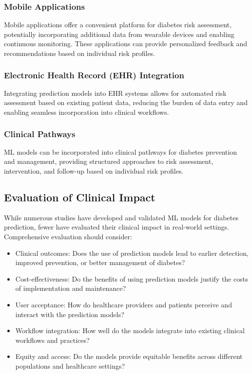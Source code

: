 \documentclass[journal]{IEEEtran}
\begin{document}
\subsubsection{Mobile Applications}
Mobile applications offer a convenient platform for diabetes risk assessment, potentially incorporating additional data from wearable devices and enabling continuous monitoring. These applications can provide personalized feedback and recommendations based on individual risk profiles.

\subsubsection{Electronic Health Record (EHR) Integration}
Integrating prediction models into EHR systems allows for automated risk assessment based on existing patient data, reducing the burden of data entry and enabling seamless incorporation into clinical workflows.

\subsubsection{Clinical Pathways}
ML models can be incorporated into clinical pathways for diabetes prevention and management, providing structured approaches to risk assessment, intervention, and follow-up based on individual risk profiles.

\subsection{Evaluation of Clinical Impact}
While numerous studies have developed and validated ML models for diabetes prediction, fewer have evaluated their clinical impact in real-world settings. Comprehensive evaluation should consider:

\begin{itemize}
    \item Clinical outcomes: Does the use of prediction models lead to earlier detection, improved prevention, or better management of diabetes?
    \item Cost-effectiveness: Do the benefits of using prediction models justify the costs of implementation and maintenance?
    \item User acceptance: How do healthcare providers and patients perceive and interact with the prediction models?
    \item Workflow integration: How well do the models integrate into existing clinical workflows and practices?
    \item Equity and access: Do the models provide equitable benefits across different populations and healthcare settings?
\end{itemize}
\end{document}
